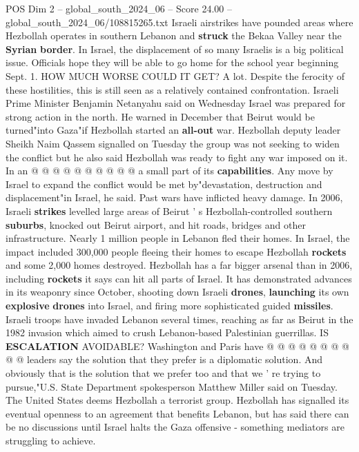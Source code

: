 \begin{textsample}{POS Dim 2 – global\_south\_2024\_06 – Score 24.00 – global\_south\_2024\_06/108815265.txt}
Israeli airstrikes have pounded areas where Hezbollah operates in southern Lebanon and \textbf{struck} the Bekaa Valley near the \textbf{Syrian} \textbf{border}.
In Israel, the displacement of so many Israelis is a big political issue.
Officials hope they will be able to go home for the school year beginning Sept. 1.
HOW MUCH WORSE COULD IT GET?
A lot.
Despite the ferocity of these hostilities, this is still seen as a relatively contained confrontation.
Israeli Prime Minister Benjamin Netanyahu said on Wednesday Israel was prepared for strong action in the north.
He warned in December that Beirut would be turned"into Gaza"if Hezbollah started an \textbf{all-out} war.
Hezbollah deputy leader Sheikh Naim Qassem signalled on Tuesday the group was not seeking to widen the conflict but he also said Hezbollah was ready to fight any war imposed on it.
In an @ @ @ @ @ @ @ @ @ @ a small part of its \textbf{capabilities}.
Any move by Israel to expand the conflict would be met by"devastation, destruction and displacement"in Israel, he said.
Past wars have inflicted heavy damage.
In 2006, Israeli \textbf{strikes} levelled large areas of Beirut ' s Hezbollah-controlled southern \textbf{suburbs}, knocked out Beirut airport, and hit roads, bridges and other infrastructure.
Nearly 1 million people in Lebanon fled their homes.
In Israel, the impact included 300,000 people fleeing their homes to escape Hezbollah \textbf{rockets} and some 2,000 homes destroyed.
Hezbollah has a far bigger arsenal than in 2006, including \textbf{rockets} it says can hit all parts of Israel.
It has demonstrated advances in its weaponry since October, shooting down Israeli \textbf{drones}, \textbf{launching} its own \textbf{explosive} \textbf{drones} into Israel, and firing more sophisticated guided \textbf{missiles}.
Israeli troops have invaded Lebanon several times, reaching as far as Beirut in the 1982 invasion which aimed to crush Lebanon-based Palestinian guerrillas.
IS \textbf{ESCALATION} AVOIDABLE?
Washington and Paris have @ @ @ @ @ @ @ @ @ @ leaders say the solution that they prefer is a diplomatic solution.
And obviously that is the solution that we prefer too and that we ' re trying to pursue,"U.S.
State Department spokesperson Matthew Miller said on Tuesday.
The United States deems Hezbollah a terrorist group.
Hezbollah has signalled its eventual openness to an agreement that benefits Lebanon, but has said there can be no discussions until Israel halts the Gaza offensive - something mediators are struggling to achieve.

\end{textsample}
